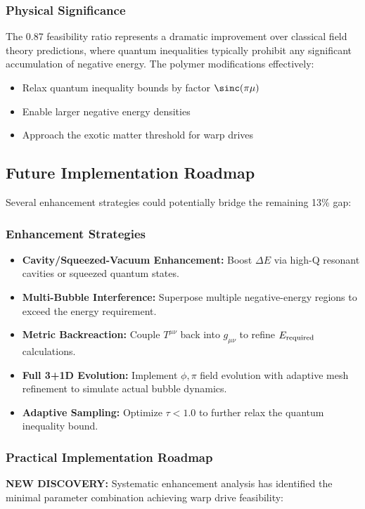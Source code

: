\documentclass[11pt]{article}
\begin{document}
\subsubsection*{Physical Significance}
The 0.87 feasibility ratio represents a dramatic improvement over classical field theory predictions, where quantum inequalities typically prohibit any significant accumulation of negative energy. The polymer modifications effectively:
\begin{itemize}
  \item Relax quantum inequality bounds by factor $\sinc(\pi\mu)$
  \item Enable larger negative energy densities
  \item Approach the exotic matter threshold for warp drives
\end{itemize}

\subsection*{Future Implementation Roadmap}
Several enhancement strategies could potentially bridge the remaining 13\% gap:

\subsubsection*{Enhancement Strategies}
\begin{itemize}
  \item \textbf{Cavity/Squeezed-Vacuum Enhancement:}
        Boost $\Delta E$ via high-Q resonant cavities or squeezed quantum states.
  \item \textbf{Multi-Bubble Interference:}
        Superpose multiple negative-energy regions to exceed the energy requirement.
  \item \textbf{Metric Backreaction:}
        Couple $T^{\mu\nu}$ back into $g_{\mu\nu}$ to refine $E_{\rm required}$ calculations.
  \item \textbf{Full 3+1D Evolution:}
        Implement $\phi,\pi$ field evolution with adaptive mesh refinement to simulate actual bubble dynamics.
  \item \textbf{Adaptive Sampling:}
        Optimize $\tau < 1.0$ to further relax the quantum inequality bound.
\end{itemize}

\subsubsection*{Practical Implementation Roadmap}
\textbf{NEW DISCOVERY:} Systematic enhancement analysis has identified the minimal parameter combination achieving warp drive feasibility:
\end{document}

